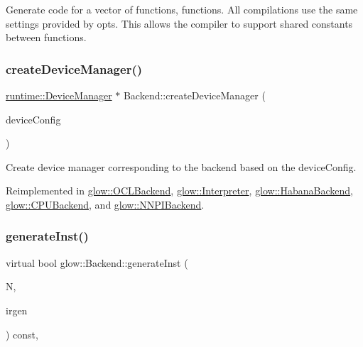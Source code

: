 Generate code for a vector of functions, {\ttfamily functions}. All compilations use the same settings provided by {\ttfamily opts}. This allows the compiler to support shared constants between functions. \mbox{\label{classglow_1_1_backend_ab52ff7cc7a83edb282bea2cbf4b8766e}} 
\subsubsection{\texorpdfstring{create\+Device\+Manager()}{createDeviceManager()}}
{\footnotesize\ttfamily \hyperlink{classglow_1_1runtime_1_1_device_manager}{runtime\+::\+Device\+Manager} $\ast$ Backend\+::create\+Device\+Manager (\begin{DoxyParamCaption}\item[{const \hyperlink{structglow_1_1runtime_1_1_device_config}{runtime\+::\+Device\+Config} \&}]{device\+Config }\end{DoxyParamCaption})\hspace{0.3cm}{\ttfamily [virtual]}}

Create device manager corresponding to the backend based on the device\+Config. 

Reimplemented in \hyperlink{classglow_1_1_o_c_l_backend_af3d1f85d01ed17ab2358ec4bdcff7b2f}{glow\+::\+O\+C\+L\+Backend}, \hyperlink{classglow_1_1_interpreter_ab14be2abaedd8d7e090bf1aaf874c423}{glow\+::\+Interpreter}, \hyperlink{classglow_1_1_habana_backend_a8ae721f9f76b5ce37663348fcd8ddeeb}{glow\+::\+Habana\+Backend}, \hyperlink{classglow_1_1_c_p_u_backend_a038b765b85ac399a91437a82f044f28d}{glow\+::\+C\+P\+U\+Backend}, and \hyperlink{classglow_1_1_n_n_p_i_backend_ad40f8e5a376846bcf4d2f615ffc373e7}{glow\+::\+N\+N\+P\+I\+Backend}.

\mbox{\label{classglow_1_1_backend_a598326caeb8b10e693a9c623b1821e43}} 
\subsubsection{\texorpdfstring{generate\+Inst()}{generateInst()}}
{\footnotesize\ttfamily virtual bool glow\+::\+Backend\+::generate\+Inst (\begin{DoxyParamCaption}\item[{\hyperlink{classglow_1_1_node}{Node} $\ast$}]{N,  }\item[{\hyperlink{classglow_1_1_i_r_gen_visitor}{I\+R\+Gen\+Visitor} \&}]{irgen }\end{DoxyParamCaption}) const\hspace{0.3cm}{\ttfamily [inline]}, {\ttfamily [virtual]}}

